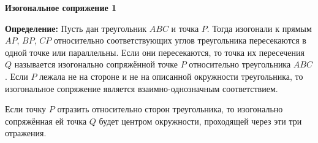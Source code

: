 \documentclass{article}
\begin{document}
\large



\begin{center}
\textbf{Изогональное сопряжение 1}
\end{center}

\textbf{Определение:} Пусть дан треугольник $ABC$ и точка $P$. Тогда изогонали к прямым $AP$, $BP$, $CP$ относительно соответствующих углов треугольника пересекаются в одной точке или параллельны. Если они пересекаются, то точка их пересечения $Q$ называется изогонально сопряжённой точке $P$ относительно треугольника $ABC$. Если $P$ лежала не на стороне и не на описанной окружности треугольника, то изогональное сопряжение является взаимно-однозначным соответствием.

Если точку $P$ отразить относительно сторон треугольника, то изогонально сопряжённая ей точка $Q$ будет центром окружности, проходящей через эти три отражения.
\end{document}

